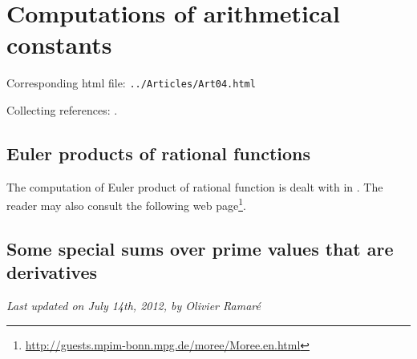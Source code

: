 \chapter{   Computations of arithmetical constants}

Corresponding html file: \texttt{../Articles/Art04.html}









Collecting references:
\cite{Cazaran-Moree*99}.

 
 


\section{Euler products of rational functions}


The computation of Euler product of rational function is dealt with in
\cite{Moree*12}. The reader may
also consult the following
web page\footnote{\url{http://guests.mpim-bonn.mpg.de/moree/Moree.en.html}}.


\section{Some special sums over prime values that are derivatives}









  
\begin{flushright}\small\sl{}   Last updated on July 14th, 2012, by Olivier Ramar\'e
 \end{flushright}
















